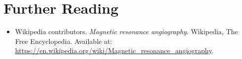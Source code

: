 \section{Further Reading}
\begin{itemize}
  \item Wikipedia contributors. \textit{Magnetic resonance angiography}. Wikipedia, The Free Encyclopedia. Available at: \url{https://en.wikipedia.org/wiki/Magnetic_resonance_angiography}.
\end{itemize}
